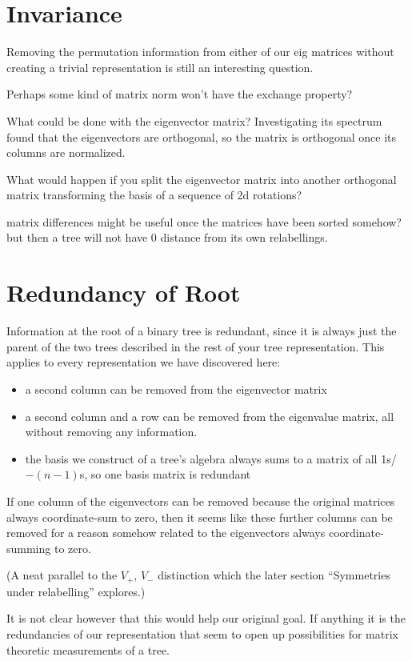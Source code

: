 \documentclass[10pt,a4paper]{report}
\begin{document}
\section{Invariance}

Removing the permutation information from either of our eig matrices without
creating a trivial representation is still an interesting question.

Perhaps some kind of matrix norm won't have the exchange property?

What could be done with the eigenvector matrix? Investigating its spectrum
found that the eigenvectors are orthogonal, so the matrix is orthogonal once
its columns are normalized.

What would happen if you split the eigenvector matrix into another orthogonal
matrix transforming the basis of a sequence of 2d rotations?

matrix differences might be useful once the matrices have been sorted somehow?
but then a tree will not have 0 distance from its own relabellings.

\section{Redundancy of Root}

Information at the root of a binary tree is redundant, since it is always just
the parent of the two trees described in the rest of your tree representation.
This applies to every representation we have discovered here:
\begin{itemize}
	\item a second column can be removed from the eigenvector matrix
	\item a second column and a row can be removed from the eigenvalue matrix,
		all without removing any information.
	\item the basis we construct of a tree's algebra always sums to a matrix of
		all 1s/$-(n-1)$s, so one basis matrix is redundant
\end{itemize}

If one column of the eigenvectors can be removed because the original matrices
always coordinate-sum to zero, then it seems like these further columns can be
removed for a reason somehow related to the eigenvectors always
coordinate-summing to zero.

(A neat parallel to the $V_+$, $V_-$ distinction which the later section
``Symmetries under relabelling'' explores.)

It is not clear however that this would help our original goal. If anything it
is the redundancies of our representation that seem to open up possibilities
for matrix theoretic measurements of a tree.
\end{document}
